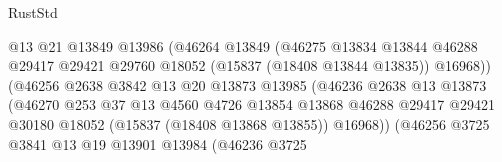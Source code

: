 \begin{lexlean}{RustStd}
\begin{coremodule}
{\begin{coremodule}
{{{{{{{{{{{{{{{{{{{{{{{{{{{{{{{{{{{{{{{{{{{{{{{{{{{{{{{{{{{{                                        @13
                                        @21
                                        @13849
                                        @13986
                                        (@46264
                                          @13849
                                          (@46275
                                            @13834
                                            @13844
                                            @46288
                                            @29417
                                            @29421
                                            @29760
                                            @18052
                                            (@15837 (@18408 @13844 @13835))
                                            @16968))
                                        (@46256
                                          @2638
                                          @3842
                                          @13
                                          @20
                                          @13873
                                          @13985
                                          (@46236
                                            @2638
                                            @13
                                            @13873
                                            (@46270
                                              @253
                                              @37
                                              @13
                                              @4560
                                              @4726
                                              @13854
                                              @13868
                                              @46288
                                              @29417
                                              @29421
                                              @30180
                                              @18052
                                              (@15837 (@18408 @13868 @13855))
                                              @16968))
                                          (@46256
                                            @3725
                                            @3841
                                            @13
                                            @19
                                            @13901
                                            @13984
                                            (@46236
                                              @3725
}}}}}}}}}}}}}}}}}}}}}}}}}}}}}}}}}}}}}}}}}}}}}}}}}}}}}}}}}}}}
\end{coremodule}}
\end{coremodule}
\end{lexlean}
